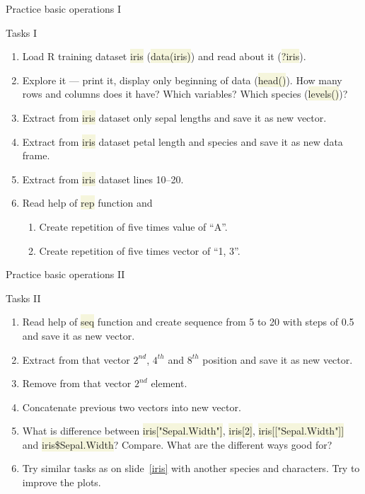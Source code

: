 \documentclass[compress, ucs, xelatex, 11pt, xcolor=svgnames, aspectratio=169,
	hyperref={
		bookmarks=true,
		unicode=true,
		colorlinks=true,
		pdftitle={Molecular data in R},
		plainpages=false,
		pdfauthor={Vojtech Zeisek},
		pdfsubject={Course about phylogeny and evolution in R},
		pdfcreator={XeLaTeX},
		pdfkeywords={R, evolution, phylogeny, molecular data},
		linkcolor=Crimson, %
		anchorcolor=Magenta, %
		citecolor=Magenta, %
		filecolor=Magenta, %
		menucolor=Magenta, %
		urlcolor=DodgerBlue, %
		pdftex},
	url={hyphens, lowtilde} %
	]{beamer}
\renewcommand{\texttt}[1]{\colorbox{Beige}{{\ttfamily #1}}}
\begin{document}
\begin{frame}{Practice basic operations I}
	\begin{exampleblock}{Tasks I}
		\begin{enumerate}
			\item Load R training dataset \texttt{iris} (\texttt{data(iris)}) and read about it (\texttt{?iris}).
			\item Explore it --- print it, display only beginning of data (\texttt{head()}). How many rows and columns does it have? Which variables? Which species (\texttt{levels()})?
			\item Extract from \texttt{iris} dataset only sepal lengths and save it as new vector.
			\item Extract from \texttt{iris} dataset petal length and species and save it as new data frame.
			\item Extract from \texttt{iris} dataset lines 10--20.
			\item Read help of \texttt{rep} function and
			\begin{enumerate}
				\item Create repetition of five times value of \enquote{A}.
				\item Create repetition of five times vector of \enquote{1, 3}.
			\end{enumerate}
		\end{enumerate}
	\end{exampleblock}
\end{frame}

\begin{frame}{Practice basic operations II}
	\begin{exampleblock}{Tasks II}
		\begin{enumerate}
			\item Read help of \texttt{seq} function and create sequence from 5 to 20 with steps of 0.5 and save it as new vector.
			\item Extract from that vector $2^{nd}$, $4^{th}$ and $8^{th}$ position and save it as new vector.
			\item Remove from that vector $2^{nd}$ element.
			\item Concatenate previous two vectors into new vector.
			\item What is difference between \texttt{iris["Sepal.Width"]}, \texttt{iris[2]}, \texttt{iris[["Sepal.Width"]]} and \texttt{iris\$Sepal.Width}? Compare. What are the different ways good for?
			\item Try similar tasks as on slide~\ref{iris} with another species and characters. Try to improve the plots.
		\end{enumerate}
	\end{exampleblock}
\end{frame}
\end{document}

